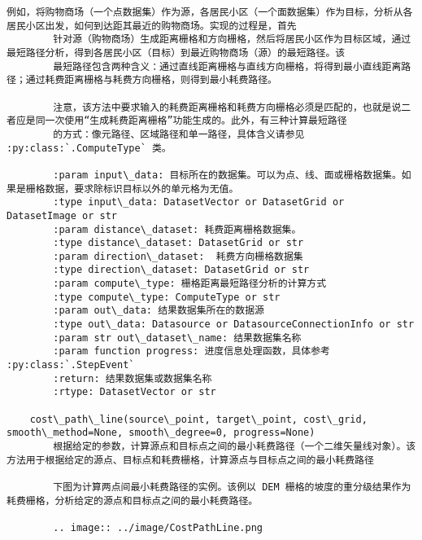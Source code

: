 \documentclass[11pt]{article}
\begin{document}
\begin{Verbatim}[commandchars=\\\{\}]
        例如，将购物商场（一个点数据集）作为源，各居民小区（一个面数据集）作为目标，分析从各居民小区出发，如何到达距其最近的购物商场。实现的过程是，首先
        针对源（购物商场）生成距离栅格和方向栅格，然后将居民小区作为目标区域，通过最短路径分析，得到各居民小区（目标）到最近购物商场（源）的最短路径。该
        最短路径包含两种含义：通过直线距离栅格与直线方向栅格，将得到最小直线距离路径；通过耗费距离栅格与耗费方向栅格，则得到最小耗费路径。
        
        注意，该方法中要求输入的耗费距离栅格和耗费方向栅格必须是匹配的，也就是说二者应是同一次使用“生成耗费距离栅格”功能生成的。此外，有三种计算最短路径
        的方式：像元路径、区域路径和单一路径，具体含义请参见 :py:class:`.ComputeType` 类。
        
        :param input\_data: 目标所在的数据集。可以为点、线、面或栅格数据集。如果是栅格数据，要求除标识目标以外的单元格为无值。
        :type input\_data: DatasetVector or DatasetGrid or DatasetImage or str
        :param distance\_dataset: 耗费距离栅格数据集。
        :type distance\_dataset: DatasetGrid or str
        :param direction\_dataset:  耗费方向栅格数据集
        :type direction\_dataset: DatasetGrid or str
        :param compute\_type: 栅格距离最短路径分析的计算方式
        :type compute\_type: ComputeType or str
        :param out\_data: 结果数据集所在的数据源
        :type out\_data: Datasource or DatasourceConnectionInfo or str
        :param str out\_dataset\_name: 结果数据集名称
        :param function progress: 进度信息处理函数，具体参考 :py:class:`.StepEvent`
        :return: 结果数据集或数据集名称
        :rtype: DatasetVector or str
    
    cost\_path\_line(source\_point, target\_point, cost\_grid, smooth\_method=None, smooth\_degree=0, progress=None)
        根据给定的参数，计算源点和目标点之间的最小耗费路径（一个二维矢量线对象）。该方法用于根据给定的源点、目标点和耗费栅格，计算源点与目标点之间的最小耗费路径
        
        下图为计算两点间最小耗费路径的实例。该例以 DEM 栅格的坡度的重分级结果作为耗费栅格，分析给定的源点和目标点之间的最小耗费路径。
        
        .. image:: ../image/CostPathLine.png
        

\end{Verbatim}
\end{document}
